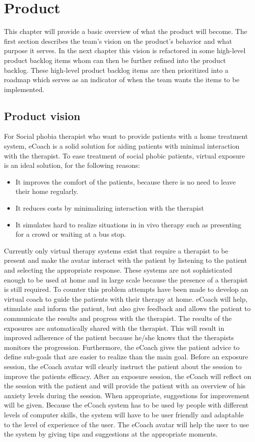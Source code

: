 \chapter{Product}
This chapter will provide a basic overview of what the product will become. The first section describes the team's vision on the product's behavior and what purpose it serves. In the next chapter this vision is refactored in some high-level product backlog items whom can then be further refined into the product backlog. These high-level product backlog items are then prioritized into a roadmap which serves as an indicator of when the team wants the items to be implemented.

\section{Product vision}
For Social phobia therapist who want to provide patients with a home treatment system, \gls{eCoach} is a  solid solution for aiding patients with minimal interaction with the therapist. To ease treatment of social phobic patients, virtual exposure is an ideal solution, for the following reasons:
\begin{itemize}
\item It improves the comfort of the patients, because there is no need to leave their home regularly.
\item It reduces costs by minimalizing interaction with the therapist
\item It simulates hard to realize situations in in vivo therapy such as presenting for a crowd or waiting at a bus stop.
\end{itemize}
Currently only virtual therapy systems exist that require a therapist to be present and make the \gls{avatar} interact with the patient by listening to the patient and selecting the appropriate response. These systems are not sophisticated enough to be used at home and in large scale because the presence of a therapist is still required. To counter this problem attempts have been made to develop an virtual coach to guide the patients with their therapy at home.
\gls{eCoach} will help, stimulate and inform the patient, but also give feedback and allows the patient to communicate the results and progress with the therapist. The results of the exposures are automatically shared with the therapist. This will result in improved adherence of the patient because he/she knows that the therapists monitors the progression.
Furthermore, the \gls{eCoach} gives the patient advice to define sub-goals that are easier to realize than the main goal. Before an exposure session, the \gls{eCoach} \gls{avatar} will clearly instruct the patient about the session to improve the patients efficacy. After an exposure session, the \gls{eCoach} will reflect on the session with the patient and will provide the patient with an overview of his anxiety levels during the session. When appropriate, suggestions for improvement will be given.
Because the \gls{eCoach} system has to be used by people with different levels of computer skills, the system will have to be user friendly and adaptable to the level of experience of the user. The \gls{eCoach} \gls{avatar} will help the user to use the system by giving tips and suggestions at the appropriate moments.


